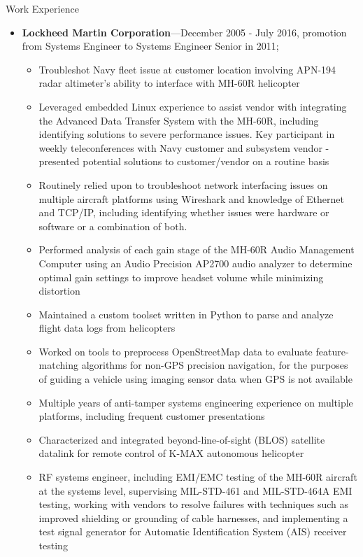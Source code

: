 \documentclass[10pt,oneside]{article}
\newenvironment{ressection}[1]{
	\vspace{4pt}
	{\Large#1}
	\begin{itemize}
	\vspace{3pt}
}{
	\end{itemize}
}
\newcommand{\ressubitem}[1]{
	\vspace{-1pt}
	\item \begin{flushleft} #1 \end{flushleft}
}
\newcommand{\resbigitem}[3]{
	\vspace{-5pt}
	\item
	\textbf{#1}---#2; \quad \textit{#3}
}
\newenvironment{ressubsec}[3]{
	\resbigitem{#1}{#2}{#3}
	\vspace{-2pt}
	\begin{itemize}
}{
	\end{itemize}
}
\newenvironment{ressection}[1]{
	\vspace{4pt}
	{\fontfamily{phv}\selectfont\Large#1}
	\begin{itemize}[leftmargin=12pt]
	\vspace{3pt}
}{
	\end{itemize}
}
\newcommand{\ressubitem}[1]{
	\vspace{-1pt}
	\item \begin{flushleft} #1 \end{flushleft}
}
\newcommand{\resbigitem}[2]{
	\vspace{-5pt}
	\item
	\textbf{#1}---\textit{#2}
}
\newenvironment{ressubsec}[2]{
	\resbigitem{#1}{#2}
	\vspace{-2pt}
	\begin{itemize}[leftmargin=12pt]
}{
	\end{itemize}
}
\begin{document}
\begin{ressection}{Work Experience}

	\begin{ressubsec}{Lockheed Martin Corporation}{December 2005 - July 2016, promotion from Systems Engineer to Systems Engineer Senior in 2011}
          \ressubitem{Display test and measurement subject matter expert - sunlight readability evaluation, night vision compatibility evaluation, contrast and luminance measurement, chromaticity measurement in support of multiple platforms}
	  \ressubitem{Troubleshot Navy fleet issue at customer location involving APN-194 radar altimeter's ability to interface with MH-60R helicopter}
          \ressubitem{Leveraged embedded Linux experience to assist vendor with integrating the Advanced Data Transfer System with the MH-60R, including identifying solutions to severe performance issues.  Key participant in weekly teleconferences with Navy customer and subsystem vendor - presented potential solutions to customer/vendor on a routine basis}
          \ressubitem{Routinely relied upon to troubleshoot network interfacing issues on multiple aircraft platforms using Wireshark and knowledge of Ethernet and TCP/IP, including identifying whether issues were hardware or software or a combination of both.}
          \ressubitem{Performed analysis of each gain stage of the MH-60R Audio Management Computer using an Audio Precision AP2700 audio analyzer to determine optimal gain settings to improve headset volume while minimizing distortion}
          \ressubitem{Maintained a custom toolset written in Python to parse and analyze flight data logs from helicopters}
          \ressubitem{Worked on tools to preprocess OpenStreetMap data to evaluate feature-matching algorithms for non-GPS precision navigation, for the purposes of guiding a vehicle using imaging sensor data when GPS is not available}
          \ressubitem{Multiple years of anti-tamper systems engineering experience on multiple platforms, including frequent customer presentations}
          \ressubitem{Characterized and integrated beyond-line-of-sight (BLOS) satellite datalink for remote control of K-MAX autonomous helicopter}
          \ressubitem{RF systems engineer, including EMI/EMC testing of the MH-60R aircraft at the systems level, supervising MIL-STD-461 and MIL-STD-464A EMI testing, working with vendors to resolve failures with techniques such as improved shielding or grounding of cable harnesses, and implementing a test signal generator for Automatic Identification System (AIS) receiver testing}
	\end {ressubsec}


\end{ressection}
\end{document}
